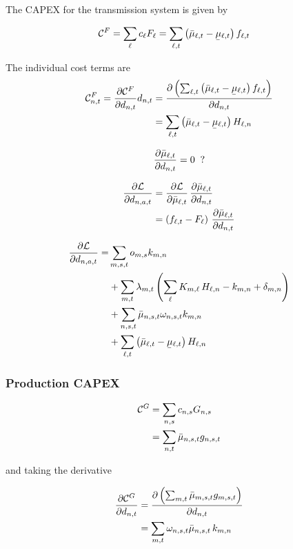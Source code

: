 \documentclass[a4paper,10pt]{article}
\begin{document}
The CAPEX for the transmission system is given by 

\begin{align}
 \totalCapexFlow & = \sum_\ell \capexFlow \capacityFlow = \sum_{\ell,t} \left( \muupperflow - \mulowerflow \right)  \flow 
\end{align}

The individual cost terms are 
\begin{align}
\allocateCapexFlow = \pdv{\totalCapexFlow}{\nodaldemand}\nodaldemand & = \pdv{\left( \sum_{\ell,t} \left( \muupperflow - \mulowerflow \right)  \flow \right) }{\nodaldemand} \\
&= \sum_{\ell,t} \left( \muupperflow - \mulowerflow \right) \ptdf 
\end{align}

\begin{align}
 \pdv{\muupperflow}{\nodaldemand} = 0 \;\; ?
\end{align}

\begin{align}
\pdv{\lagrangian}{\demand} & = \pdv{\lagrangian}{\muupperflow} \,  \pdv{\muupperflow} {\nodaldemand} \\
&= \left( \flow - \capacityFlow \right)  \,  \pdv{\muupperflow} {\nodaldemand}
\end{align}


\begin{align}
\notag
 \pdv{\lagrangian}{\demand}
 =&    \sum_{m, s, t} \opexGeneration[m] \Slack  \\
\notag
&+ \sum_{m,t} \lmp[m] \left(\sum_\ell \incidence[m] \, \ptdf  - \Slack + \delta_{m,n}  \right)  \\ 
\notag
&+ \sum_{n,s,t} \muuppergeneration \generationshare \Slack %
\\
&+ \sum_{\ell,t} \left( \muupperflow - \mulowerflow \right) \ptdf      
\label{eq:full_lagrangian}
\end{align}



\subsubsection*{Production CAPEX}
\begin{align}
 \totalCapexGeneration& = \sum_{n,s} \capexGeneration \capacityGeneration\\
 &= \sum_{n,t} \muuppergeneration  \generation 
\end{align}

and taking the derivative 

\begin{align}
\pdv{\totalCapexGeneration}{\nodaldemand} & = \pdv{ \left(  \sum_{m,t} \muuppergeneration[m]  \generation[m] \right) }{\nodaldemand} \\
&= \sum_{m,t} \generationshare  \muuppergeneration \, \Slack
\end{align}
\end{document}
